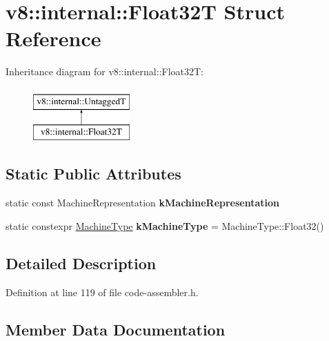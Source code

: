 \hypertarget{structv8_1_1internal_1_1Float32T}{}\section{v8\+:\+:internal\+:\+:Float32T Struct Reference}
\label{structv8_1_1internal_1_1Float32T}
Inheritance diagram for v8\+:\+:internal\+:\+:Float32T\+:\begin{figure}[H]
\begin{center}
\leavevmode
\includegraphics[height=2.000000cm]{structv8_1_1internal_1_1Float32T}
\end{center}
\end{figure}
\subsection*{Static Public Attributes}
\begin{DoxyCompactItemize}
\item 
static const Machine\+Representation {\bfseries k\+Machine\+Representation}
\item 
\mbox{\label{structv8_1_1internal_1_1Float32T_a6711181b5c6b7e2eae67838d0de39534}} 
static constexpr \mbox{\hyperlink{classv8_1_1internal_1_1MachineType}{Machine\+Type}} {\bfseries k\+Machine\+Type} = Machine\+Type\+::\+Float32()
\end{DoxyCompactItemize}


\subsection{Detailed Description}


Definition at line 119 of file code-\/assembler.\+h.



\subsection{Member Data Documentation}
\mbox{\label{structv8_1_1internal_1_1Float32T_a4c352a1c55caf6a46fb779d2543ac9b3}} 
